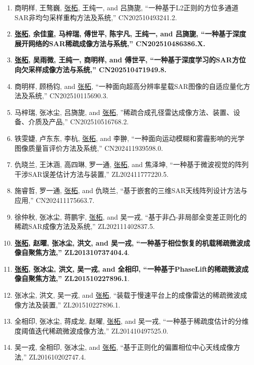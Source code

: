 \documentclass[paper=a4,fontsize=11pt]{scrartcl}
\begin{document}
\begin{enumerate}
	
\item 商明样, 王骜巍, \underline{张柘}, 王纯一, and 吕旖旎, ``一种基于L2正则的方位多通道SAR非均匀采样重构方法及系统,'' CN202510493241.2.

\item \textbf{\underline{张柘}, 余佳童, 马梓瑞, 傅世平, 陈宇凡, 王纯一, and 吕旖旎, ``一种基于深度展开网络的SAR稀疏成像方法与系统,'' CN202510486386.X.}

\item \textbf{\underline{张柘}, 吴雨微, 王纯一, 商明样, and 傅世平, ``一种基于深度学习的SAR方位向欠采样成像方法与系统,'' CN202510471949.8.}

\item 商明样, 顾杨钧, and \underline{张柘}, ``一种面向超高分辨率星载SAR图像的自适应量化方法及系统,'' CN202510115690.3.

\item 马梓瑞, 张冰尘, 吕旖旎, and \underline{张柘}, ''稀疏合成孔径雷达成像方法、装置、设备、介质及产品,'' CN202510516768.2.

\item 铁雯婕, 卢东东, 李杭, \underline{张柘}, and 李翀, ``一种面向运动模糊和雾霾影响的光学图像质量盲评价方法及系统,'' CN202411939598.0.

\item 仇晓兰, 王沐涵, 高四琳, 罗一通, \underline{张柘}, and 焦泽坤, ``一种基于微波视觉的阵列干涉SAR误差估计方法与装置,'' ZL202411777220.5.

\item 施睿哲, 罗一通, \underline{张柘}, and 仇晓兰, ``基于嵌套的三维SAR天线阵列设计方法与应用,'' CN202411175663.7.

\item 徐仲秋, 张冰尘, 蒋鹏宇, \underline{张柘}, and 吴一戎, ``基于非凸-非局部全变差正则化的稀疏SAR成像方法及系统,'' ZL202111402837.5.

\item \textbf{\underline{张柘}, 赵曜, 张冰尘, 洪文, and 吴一戎, ``一种基于相位恢复的机载稀疏微波成像自聚焦方法,'' ZL201310737404.4}.

\item \textbf{\underline{张柘}, 张冰尘, 洪文, 吴一戎, and 全相印, ``一种基于PhaseLift的稀疏微波成像自聚焦方法,'' ZL201510227896.1}.

\item 张冰尘, 洪文, 吴一戎, and \underline{张柘}, ``装载于慢速平台上的成像雷达的稀疏微波成像方法及装置,'' ZL201510227896.1.

\item 全相印, 张冰尘, 蒋成龙, 赵曜, \underline{张柘}, and 吴一戎, ``一种基于稀疏度估计的分维度阈值迭代稀疏微波成像方法,'' ZL201410497525.0.

\item 吴一戎, 全相印, 张冰尘, and \underline{张柘}, ``基于正则化的偏置相位中心天线成像方法,'' ZL201610202747.4.

\end{enumerate}
\end{document}
